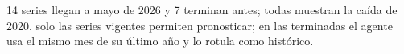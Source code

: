 {14 series llegan a mayo de 2026 y 7 terminan antes; todas muestran la caída de 2020.}
{solo las series vigentes permiten pronosticar; en las terminadas el agente usa el mismo mes de su último año y lo rotula como histórico.}
